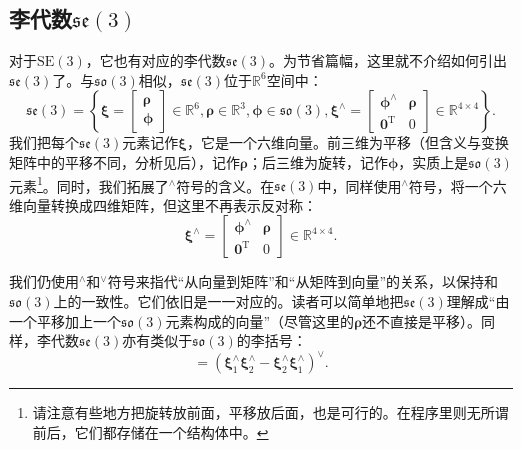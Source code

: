 \subsection{李代数$\mathfrak{se}(3)$}
对于$\mathrm{SE}(3)$，它也有对应的李代数$\mathfrak{se}(3)$。为节省篇幅，这里就不介绍如何引出$\mathfrak{se}(3)$了。与$\mathfrak{so}(3)$相似，$\mathfrak{se}(3)$位于$\mathbb{R}^6$空间中：
\begin{equation}
\mathfrak{se}(3) = \left\{ { \boldsymbol{\xi}  = \left[ \begin{array}{l}
	\boldsymbol{\rho} \\
	\boldsymbol{\phi} 
	\end{array} \right]
	 \in { \mathbb{R}^6} ,
	 \boldsymbol{\rho}  \in { \mathbb{R}^3}, \boldsymbol{\phi}  \in \mathfrak{so} \left( 3 \right),{ \boldsymbol{\xi} ^ \wedge } = \left[ {\begin{array}{*{20}{c}}
		{{ \boldsymbol{\phi} ^ \wedge }}& \boldsymbol{\rho} \\
		{{\bm{0}^\mathrm{T}}}&0
		\end{array}} \right] \in { \mathbb{R}^{4 \times 4}}} \right\}.
\end{equation}
我们把每个$\mathfrak{se}(3)$元素记作$\boldsymbol{\xi}$，它是一个六维向量。前三维为平移（但含义与变换矩阵中的平移不同，分析见后），记作$\boldsymbol{\rho}$；后三维为旋转，记作$\boldsymbol{\phi}$，实质上是$\mathfrak{so}(3)$元素\footnote{请注意有些地方把旋转放前面，平移放后面，也是可行的。在程序里则无所谓前后，它们都存储在一个结构体中。}。同时，我们拓展了$^\wedge$符号的含义。在$\mathfrak{se}(3)$中，同样使用$^\wedge$符号，将一个六维向量转换成四维矩阵，但这里不再表示反对称：
\begin{equation}
{ \boldsymbol{\xi} ^ \wedge } = \left[ {\begin{array}{*{20}{c}}
	{{ \boldsymbol{\phi} ^ \wedge }}& \boldsymbol{\rho} \\
	{{\bm{0}^\mathrm{T}}}&0
	\end{array}} \right] \in { \mathbb{R}^{4 \times 4}}.
\end{equation}

我们仍使用$^\wedge$和$^\vee$符号来指代“从向量到矩阵”和“从矩阵到向量”的关系，以保持和$\mathfrak{so}(3)$上的一致性。它们依旧是一一对应的。读者可以简单地把$\mathfrak{se}(3)$理解成“由一个平移加上一个$\mathfrak{so}(3)$元素构成的向量”（尽管这里的$\boldsymbol{\rho}$还不直接是平移）。同样，李代数$\mathfrak{se}(3)$亦有类似于$\mathfrak{so}(3)$的李括号：
\begin{equation}
[ \boldsymbol{\xi}_1, \boldsymbol{\xi}_2 ] = \left( \boldsymbol{\xi}_1^\wedge \boldsymbol{\xi}_2^\wedge -\boldsymbol{\xi}_2^\wedge \boldsymbol{\xi}_1^\wedge \right) ^\vee.
\end{equation}

